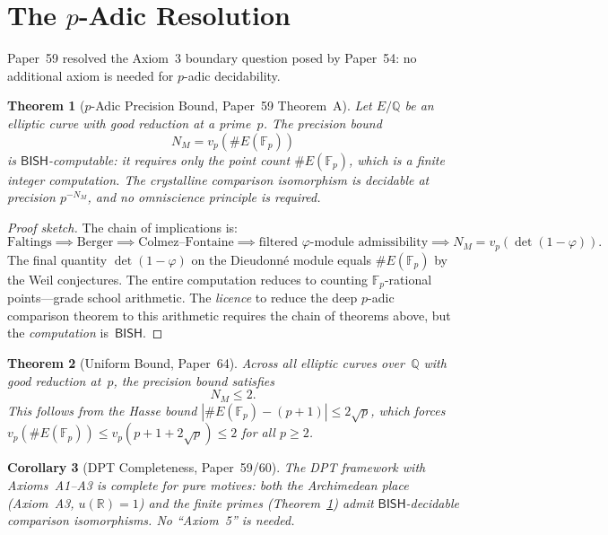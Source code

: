 \documentclass[11pt]{article}
\theoremstyle{plain}
\newtheorem{theorem}{Theorem}[section]
\newtheorem{corollary}[theorem]{Corollary}
\theoremstyle{definition}
\theoremstyle{remark}
\newcommand{\Q}{\mathbb{Q}}
\newcommand{\R}{\mathbb{R}}
\newcommand{\F}{\mathbb{F}}
\newcommand{\BISH}{\mathsf{BISH}}
\begin{document}
\section{The $p$-Adic Resolution}\label{sec:padic}

Paper~59 \cite{Paper59} resolved the Axiom~3 boundary question
posed by Paper~54: no additional axiom is needed for $p$-adic
decidability.

\begin{theorem}[$p$-Adic Precision Bound,
  Paper~59 Theorem~A]\label{thm:padic}
Let $E/\Q$ be an elliptic curve with good reduction at a
prime~$p$.  The precision bound
\[
  N_M = v_p(\#E(\F_p))
\]
is $\BISH$-computable: it requires only the point count
$\#E(\F_p)$, which is a finite integer computation.  The
crystalline comparison isomorphism is decidable at precision
$p^{-N_M}$, and no omniscience principle is required.
\end{theorem}

\begin{proof}[Proof sketch]
The chain of implications is:
\[
  \text{Faltings} \implies \text{Berger} \implies
  \text{Colmez--Fontaine} \implies
  \text{filtered }\varphi\text{-module admissibility}
  \implies N_M = v_p(\det(1 - \varphi)).
\]
The final quantity $\det(1 - \varphi)$ on the Dieudonn\'e module
equals $\#E(\F_p)$ by the Weil conjectures.  The entire
computation reduces to counting $\F_p$-rational points---grade
school arithmetic.  The \emph{licence} to reduce the deep
$p$-adic comparison theorem to this arithmetic requires the
chain of theorems above, but the \emph{computation} is~$\BISH$.
\end{proof}

\begin{theorem}[Uniform Bound, Paper~64]\label{thm:uniform}
Across all elliptic curves over~$\Q$ with good reduction at~$p$,
the precision bound satisfies
\[
  N_M \le 2.
\]
This follows from the Hasse bound $|\#E(\F_p) - (p+1)| \le
2\sqrt{p}$, which forces
$v_p(\#E(\F_p)) \le v_p(p + 1 + 2\sqrt{p}) \le 2$ for all
$p \ge 2$.
\end{theorem}

\begin{corollary}[DPT Completeness, Paper~59/60]
The DPT framework with Axioms~A1--A3 is complete for pure
motives: both the Archimedean place (Axiom~A3, $u(\R) = 1$)
and the finite primes (Theorem~\ref{thm:padic}) admit
$\BISH$-decidable comparison isomorphisms.  No ``Axiom~5'' is
needed.
\end{corollary}
\end{document}
